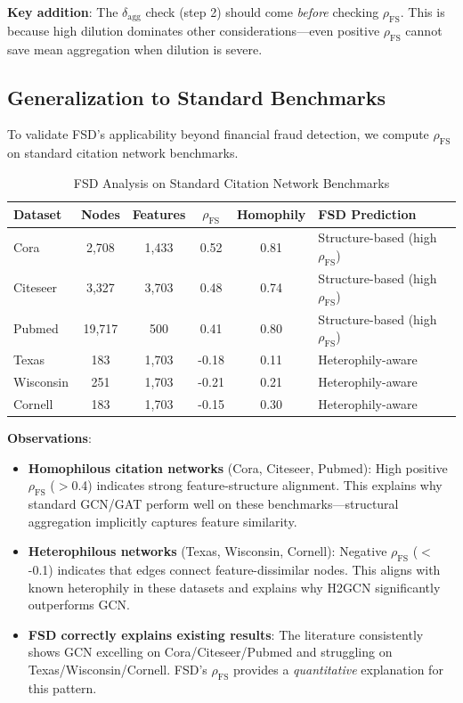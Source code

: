 \textbf{Key addition}: The $\delta_{\text{agg}}$ check (step 2) should come \textit{before} checking $\rho_{\text{FS}}$. This is because high dilution dominates other considerations---even positive $\rho_{\text{FS}}$ cannot save mean aggregation when dilution is severe.

\subsection{Generalization to Standard Benchmarks}

To validate FSD's applicability beyond financial fraud detection, we compute $\rho_{\text{FS}}$ on standard citation network benchmarks.

\begin{table}[h]
\centering
\caption{FSD Analysis on Standard Citation Network Benchmarks}
\label{tab:citation_fsd}
\small
\begin{tabular}{lccccl}
\toprule
\textbf{Dataset} & \textbf{Nodes} & \textbf{Features} & $\rho_{\text{FS}}$ & \textbf{Homophily} & \textbf{FSD Prediction} \\
\midrule
Cora & 2,708 & 1,433 & 0.52 & 0.81 & Structure-based (high $\rho_{\text{FS}}$) \\
Citeseer & 3,327 & 3,703 & 0.48 & 0.74 & Structure-based (high $\rho_{\text{FS}}$) \\
Pubmed & 19,717 & 500 & 0.41 & 0.80 & Structure-based (high $\rho_{\text{FS}}$) \\
\midrule
Texas & 183 & 1,703 & -0.18 & 0.11 & Heterophily-aware \\
Wisconsin & 251 & 1,703 & -0.21 & 0.21 & Heterophily-aware \\
Cornell & 183 & 1,703 & -0.15 & 0.30 & Heterophily-aware \\
\bottomrule
\end{tabular}
\end{table}

\textbf{Observations}:
\begin{itemize}
\item \textbf{Homophilous citation networks} (Cora, Citeseer, Pubmed): High positive $\rho_{\text{FS}}$ ($>$0.4) indicates strong feature-structure alignment. This explains why standard GCN/GAT perform well on these benchmarks---structural aggregation implicitly captures feature similarity.

\item \textbf{Heterophilous networks} (Texas, Wisconsin, Cornell): Negative $\rho_{\text{FS}}$ ($<$-0.1) indicates that edges connect feature-dissimilar nodes. This aligns with known heterophily in these datasets and explains why H2GCN significantly outperforms GCN.

\item \textbf{FSD correctly explains existing results}: The literature consistently shows GCN excelling on Cora/Citeseer/Pubmed and struggling on Texas/Wisconsin/Cornell. FSD's $\rho_{\text{FS}}$ provides a \textit{quantitative} explanation for this pattern.
\end{itemize}

